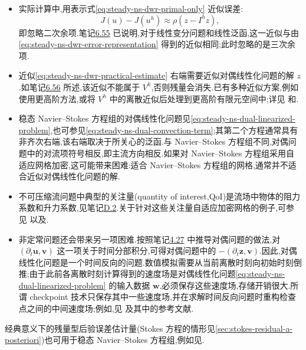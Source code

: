 \begin{note}[若干实际问题]\label{note:steady-ns-dwr-practical}
\begin{itemize}
  \item 实际计算中,用表示式\cref{eq:steady-ns-dwr-primal-only} 近似误差:
  \begin{equation}\label{eq:steady-ns-dwr-practical-estimate}
    J(u)-J(u^h)\approx\rho(z-I^h z),
  \end{equation}
  即忽略二次余项.笔记\hyperref[note:steady-ns-dwr-linear]{6.55} 已说明,对于线性变分问题和线性泛函,这一近似与由\cref{eq:steady-ns-dwr-error-representation} 得到的近似相同;此时忽略的是三次余项.

  \item 近似\cref{eq:steady-ns-dwr-practical-estimate} 右端需要近似对偶线性化问题的解 $z$.如笔记\hyperref[note:steady-ns-dwr-remove-dual-motivation]{6.56} 所述,该近似不能属于 $V^h$,否则残量会消失.已有多种近似方案,例如使用更高阶方法,或将 $V^h$ 中的离散近似后处理到更高阶有限元空间中;详见\textcite[第 5 节]{BeckerRannacher2001} 和\textcite[第 4.1 节]{BangerthRannacher2003}.

  \item 稳态 Navier--Stokes 方程组的对偶线性化问题见\cref{eq:steady-ns-dual-linearized-problem},也可参见\cref{eq:steady-ns-dual-convection-term};其第二个方程通常具有非齐次右端,该右端取决于所关心的泛函.与 Navier--Stokes 方程组不同,对偶问题中的对流项符号相反,即主流方向相反.如果对 Navier--Stokes 方程组采用自适应网格加密,这可能带来困难:适合 Navier--Stokes 方程组的网格,通常并不适合近似对偶线性化问题的解.

\item 不可压缩流问题中典型的关注量(quantity of interest,QoI)是流场中物体的阻力系数和升力系数,见笔记\hyperref[note:appendix-d-2]{D.2}.关于针对这些关注量自适应加密网格的例子,可参见\textcite{Becker2000} 以及\textcite[第 8 节]{BeckerRannacher2001}.

  \item 非定常问题还会带来另一项困难.按照笔记\hyperref[note:stokes-regular-dual-problem]{4.27} 中推导对偶问题的做法,对 $(\partial_t\bm{u},\bm{v})$ 这一项关于时间分部积分,可得对偶问题中的 $-(\partial_t\bm{z},\bm{v})$.因此,对偶线性化问题是一个时间反向的问题.数值模拟需要从当前离散时刻向初始时刻倒推;由于此前各离散时刻计算得到的速度场是对偶线性化问题\cref{eq:steady-ns-dual-linearized-problem} 的输入数据 $\bm{w}$,必须保存这些速度场,存储开销很大.所谓 checkpoint 技术只保存其中一些速度场,并在求解时间反向问题时重构检查点之间的中间速度场;例如,见\textcite{BesierRannacher2012} 及其中的参考文献.
\end{itemize}
\end{note}

\begin{note}[经典残量型后验误差估计量]\label{note:steady-ns-classical-residual-estimators}
经典意义下的残量型后验误差估计量(Stokes 方程的情形见\cref{sec:stokes-residual-a-posteriori})也可用于稳态 Navier--Stokes 方程组,例如见\textcite[第 5.4.3 节]{Verfuerth2013}.
\end{note}
